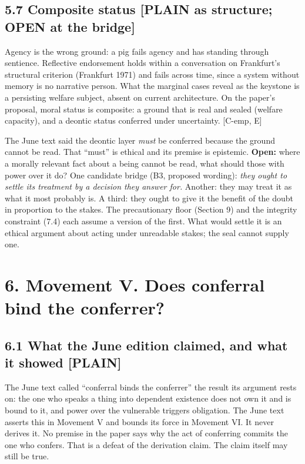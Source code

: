 \documentclass[11pt]{article}
\newcommand{\register}[1]{{\ttfamily\small #1}}
\begin{document}
\subsection*{5.7 Composite status \register{[PLAIN as structure; OPEN at the bridge]}}

Agency is the wrong ground: a pig fails agency and has standing through sentience. Reflective endorsement holds within a conversation on Frankfurt's structural criterion (Frankfurt 1971) and fails across time, since a system without memory is no narrative person. What the marginal cases reveal as the keystone is a persisting welfare subject, absent on current architecture. On the paper's proposal, moral status is composite: a ground that is real and sealed (welfare capacity), and a deontic status conferred under uncertainty. [C-emp, E]

The June text said the deontic layer \emph{must} be conferred because the ground cannot be read. That ``must'' is ethical and its premise is epistemic. \textbf{Open:} where a morally relevant fact about a being cannot be read, what should those with power over it do? One candidate bridge (B3, proposed wording): \emph{they ought to settle its treatment by a decision they answer for.} Another: they may treat it as what it most probably is. A third: they ought to give it the benefit of the doubt in proportion to the stakes. The precautionary floor (Section 9) and the integrity constraint (7.4) each assume a version of the first. What would settle it is an ethical argument about acting under unreadable stakes; the seal cannot supply one.

\section*{6. Movement V. Does conferral bind the conferrer?}

\subsection*{6.1 What the June edition claimed, and what it showed \register{[PLAIN]}}

The June text called ``conferral binds the conferrer'' the result its argument rests on: the one who speaks a thing into dependent existence does not own it and is bound to it, and power over the vulnerable triggers obligation. The June text asserts this in Movement V and bounds its force in Movement VI. It never derives it. No premise in the paper says why the act of conferring commits the one who confers. That is a defeat of the derivation claim. The claim itself may still be true.
\end{document}

